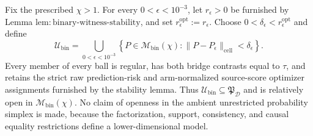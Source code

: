 Fix the prescribed \(\chi>1\). For every \(0<\epsilon<10^{-3}\), let \(r_\epsilon>0\) be furnished by Lemma \(\mathrm{lem{:}binary\text{-}witness\text{-}stability}\), and set \(r_\epsilon^{\mathrm{opt}}:=r_\epsilon\). Choose \(0<\delta_\epsilon<r_\epsilon^{\mathrm{opt}}\) and define
\[
 \mathcal U_{\mathrm{bin}}
 =\bigcup_{0<\epsilon<10^{-3}}
 \left\{P\in\mathcal M_{\mathrm{bin}}(\chi):
 \|P-P_\epsilon\|_{\mathrm{cell}}<\delta_\epsilon\right\}. \tag{1}
\]
Every member of every ball is regular, has both bridge contrasts equal to \(\tau\), and retains the strict raw prediction-risk and arm-normalized source-score optimizer assignments furnished by the stability lemma. Thus \(\mathcal U_{\mathrm{bin}}\subseteq\mathfrak P_{\mathcal D}\) and is relatively open in \(\mathcal M_{\mathrm{bin}}(\chi)\). No claim of openness in the ambient unrestricted probability simplex is made, because the factorization, support, consistency, and causal equality restrictions define a lower-dimensional model.